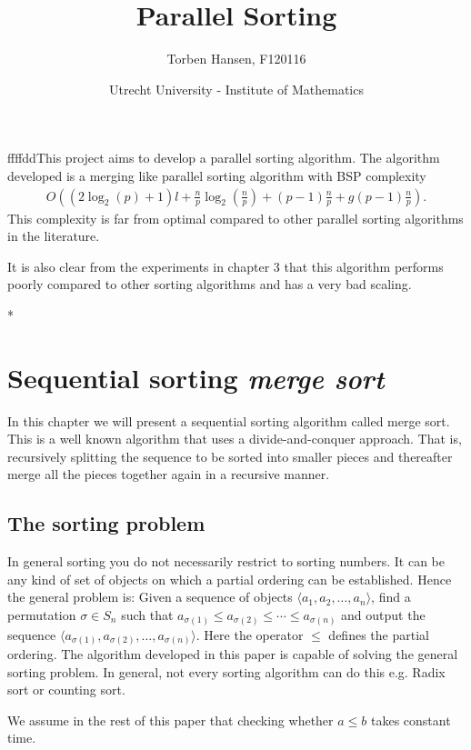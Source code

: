 \documentclass[a4paper,12pt,article]{memoir}
\title{\textbf{Parallel Sorting }}
\author{Torben Hansen, F120116}
\date{Utrecht University - Institute of Mathematics}
\theoremstyle{plain}
\theoremstyle{definition}
\theoremstyle{remark}
\theoremstyle{plain}
\theoremstyle{remark}
\begin{document}
%
\maketitle
ffffddThis project aims to develop a parallel sorting algorithm. The algorithm developed is a merging like parallel sorting algorithm with BSP complexity
\begin{align*}
O\left((2\log_2(p)+1)l+\frac{n}{p}\log_2\left(\frac{n}{p}\right)+(p-1)\frac{n}{p}+g(p-1)\frac{n}{p}\right).
\end{align*}
This complexity is far from optimal compared to other parallel sorting algorithms in the literature. 

It is also clear from the experiments in chapter 3 that this algorithm performs poorly compared to other sorting algorithms and has a very bad scaling. 

\newpage
\begin{tableofcontents}*
\end{tableofcontents}
\newpage

\chapter{Sequential sorting \textit{merge sort}}
In this chapter we will present a sequential sorting algorithm called merge sort. This is a well known algorithm that uses a divide-and-conquer approach. That is, recursively splitting the sequence to be sorted into smaller pieces and thereafter merge all the pieces together again in a recursive manner. 

\section{The sorting problem}
In general sorting you do not necessarily restrict to sorting numbers. It can be any kind of set of objects on which a partial ordering can be established. Hence the general problem is: Given a sequence of objects $\langle a_1,a_2,\ldots,a_n\rangle$, find a permutation $\sigma\in S_n$ such that $a_{\sigma(1)}\leq a_{\sigma(2)}\leq \cdots \leq a_{\sigma(n)}$ and output the sequence $\langle a_{\sigma(1)},a_{\sigma(2)},\ldots,a_{\sigma(n)}\rangle$. Here the operator $\leq$ defines the partial ordering. The algorithm developed in this paper is capable of solving the general sorting problem. In general, not every sorting algorithm can do this e.g. Radix sort or counting sort. 

We assume in the rest of this paper that checking whether $a \leq b$ takes constant time. 
\end{document}
